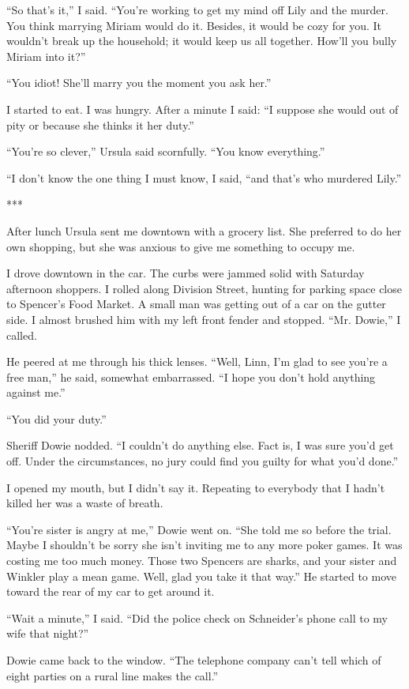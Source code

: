 \documentclass{novel}
\begin{document}
{“So that’s it,” I said. “You’re working to get my mind off Lily and the murder. You think marrying Miriam would do it. Besides, it would be cozy for you. It wouldn’t break up the household; it would keep us all together. How’ll you bully Miriam into it?”

“You idiot! She’ll marry you the moment you ask her.”

I started to eat. I was hungry. After a minute I said: “I suppose she would out of pity or because she thinks it her duty.”

“You’re so clever,” Ursula said scornfully. “You know everything.”

“I don’t know the one thing I must know, I said, “and that’s who murdered Lily.”

***

After lunch Ursula sent me downtown with a grocery list. She preferred to do her own shopping, but she was anxious to give me something to occupy me.

I drove downtown in the car. The curbs were jammed solid with Saturday afternoon shoppers. I rolled along Division Street, hunting for parking space close to Spencer’s Food Market. A small man was getting out of a car on the gutter side. I almost brushed him with my left front fender and stopped. “Mr. Dowie,” I called.

He peered at me through his thick lenses. “Well, Linn, I’m glad to see you’re a free man,” he said, somewhat embarrassed. “I hope you don’t hold anything against me.”

“You did your duty.”

Sheriff Dowie nodded. “I couldn’t do anything else. Fact is, I was sure you’d get off. Under the circumstances, no jury could find you guilty for what you’d done.”

I opened my mouth, but I didn’t say it. Repeating to everybody that I hadn’t killed her was a waste of breath.

“You’re sister is angry at me,” Dowie went on. “She told me so before the trial. Maybe I shouldn’t be sorry she isn’t inviting me to any more poker games. It was costing me too much money. Those two Spencers are sharks, and your sister and Winkler play a mean game. Well, glad you take it that way.” He started to move toward the rear of my car to get around it.

“Wait a minute,” I said. “Did the police check on Schneider’s phone call to my wife that night?”

Dowie came back to the window. “The telephone company can’t tell which of eight parties on a rural line makes the call.”

}
\end{document}
